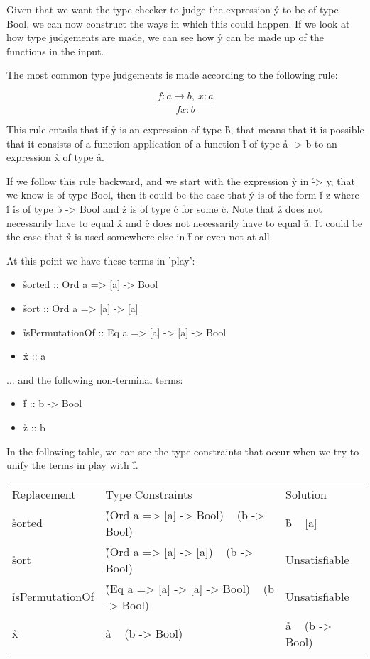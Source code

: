 \documentclass[a4paper, 11pt]{article}
\begin{document}
Given that we want the type-checker to judge the expression \h{y} to be of type \h{Bool}, we can now construct the ways in which this could happen.
If we look at how type judgements are made, we can see how \h{y} can be made up of the functions in the input.

The most common type judgements is made according to the following rule:

\[
  \frac{f : a \rightarrow b,\ x : a}{f x : b}
\]

This rule entails that if \h{y} is an expression of type \h{b}, that means that it is possible that it consists of a function application of a function \h{f} of type \h{a -> b} to an expression \h{x} of type \h{a}.

If we follow this rule backward, and we start with the expression \h{y} in \h{\x -> y}, that we know is of type \h{Bool}, then it could be the case that \h{y} is of the form \h{f z} where \h{f} is of type \h{b -> Bool} and \h{z} is of type \h{c} for some \h{c}.
Note that \h{z} does not necessarily have to equal \h{x} and \h{c} does not necessarily have to equal \h{a}.
It could be the case that \h{x} is used somewhere else in \h{f} or even not at all.

At this point we have these terms in 'play':

\begin{itemize}
  \item \h{sorted :: Ord a => [a] -> Bool}
  \item \h{sort :: Ord a => [a] -> [a]}
  \item \h{isPermutationOf :: Eq a => [a] -> [a] -> Bool}
  \item \h{x :: a}
\end{itemize}

... and the following non-terminal terms:

\begin{itemize}
  \item \h{f :: b -> Bool}
  \item \h{z :: b}
\end{itemize}

In the following table, we can see the type-constraints that occur when we try to unify the terms in play with \h{f}.

\begin{tabular}{lll}
  Replacement & Type Constraints & Solution \\
  \h{sorted} & \h{(Ord a => [a] -> Bool) ~ (b -> Bool)} & \h{b ~ [a]} \\
  \h{sort} & \h{(Ord a => [a] -> [a]) ~ (b -> Bool)} & Unsatisfiable \\
  \h{isPermutationOf} & \h{(Eq a => [a] -> [a] -> Bool) ~ (b -> Bool)} & Unsatisfiable \\
  \h{x} & \h{a ~ (b -> Bool)} & \h{a ~ (b -> Bool)} \\
\end{tabular}
\end{document}
